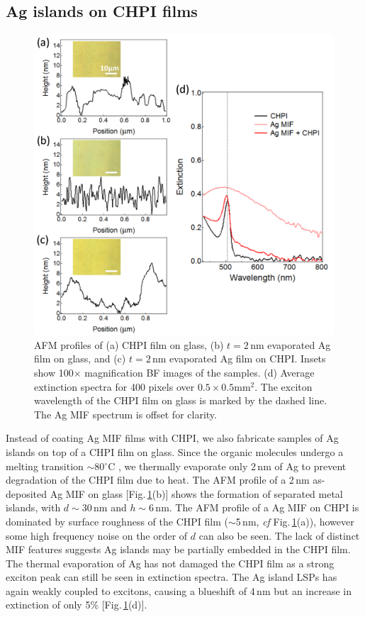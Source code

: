 \subsection{Ag islands on CHPI films}
\label{sec:AgonCHPI}
\begin{figure}[h!] 
\centering    
\includegraphics[width=\textwidth]{Fig8}
\caption{AFM profiles of (a) CHPI film on glass, (b) $t=2$\,nm evaporated Ag film on glass, and (c) $t=2$\,nm evaporated Ag film on CHPI. Insets show 100$\times$ magnification BF images of the samples. (d) Average extinction spectra for 400 pixels over $0.5\times0.5$mm$^2$. The exciton wavelength of the CHPI film on glass is marked by the dashed line. The Ag MIF spectrum is offset for clarity.}
\label{6Fig8}
\end{figure}
Instead of coating Ag MIF films with CHPI, we also fabricate samples of Ag islands on top of a CHPI film on glass. Since the organic molecules undergo a melting transition $\sim$80$^{\circ}$C \cite{Barman2003}, we thermally evaporate only 2\,nm of Ag to prevent degradation of the CHPI film due to heat. The AFM profile of a 2\,nm as-deposited Ag MIF on glass [Fig.\,\ref{6Fig8}(b)] shows the formation of separated metal islands, with $d\sim$30\,nm and $h\sim$6\,nm. The AFM profile of a Ag MIF on CHPI is dominated by surface roughness of the CHPI film ($\sim$5\,nm, \textit{cf} Fig.\,\ref{6Fig8}(a)), however some high frequency noise on the order of $d$ can also be seen. The lack of distinct MIF features suggests Ag islands may be partially embedded in the CHPI film. The thermal evaporation of Ag has not damaged the CHPI film as a strong exciton peak can still be seen in extinction spectra. The Ag island LSPs has again weakly coupled to excitons, causing a blueshift of 4\,nm but an increase in extinction of only 5\% [Fig.\,\ref{6Fig8}(d)].


